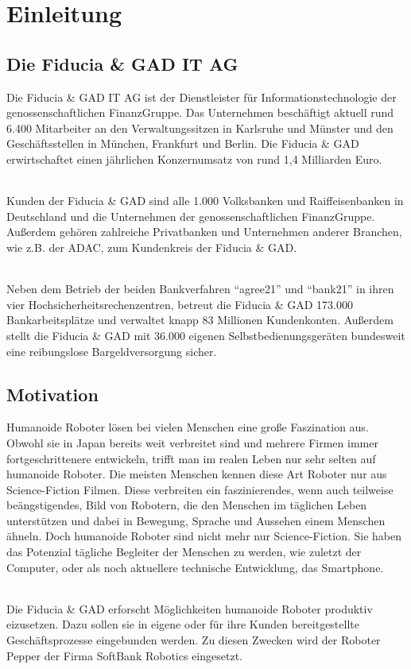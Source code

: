 \chapter{Einleitung}\label{sec:einleitung}
\section{Die Fiducia \& GAD IT AG}\label{sec:fiducia-gad}
Die Fiducia \& GAD IT AG ist der Dienstleister für Informationstechnologie der
genossenschaftlichen FinanzGruppe. Das Unternehmen beschäftigt aktuell rund
6.400 Mitarbeiter an den Verwaltungssitzen in Karlsruhe und Münster und den
Geschäftsstellen in München, Frankfurt und Berlin. Die Fiducia \& GAD
erwirtschaftet einen jährlichen Konzernumsatz von rund 1,4 Milliarden Euro.

\subparagraph{}
Kunden der Fiducia \& GAD sind alle 1.000 Volksbanken und Raiffeisenbanken in
Deutschland und die Unternehmen der genossenschaftlichen FinanzGruppe. Außerdem
gehören zahlreiche Privatbanken und Unternehmen anderer Branchen, wie z.B. der
ADAC, zum Kundenkreis der Fiducia \& GAD.

\subparagraph{}
Neben dem Betrieb der beiden Bankverfahren "`agree21"' und "`bank21"' in ihren
vier Hochsicherheitsrechenzentren, betreut die Fiducia \& GAD 173.000
Bankarbeitsplätze und verwaltet knapp 83 Millionen Kundenkonten. Außerdem stellt
die Fiducia \& GAD mit 36.000 eigenen Selbstbedienungsgeräten bundesweit eine
reibungslose Bargeldversorgung sicher. \cite{FiduciaGAD2018}

\section{Motivation}\label{sec:motivation}
Humanoide Roboter lösen bei vielen Menschen eine große Faszination aus. Obwohl
sie in Japan bereits weit verbreitet sind und mehrere Firmen immer
fortgeschrittenere entwickeln, trifft man im realen Leben nur sehr selten auf
humanoide Roboter. Die meisten Menschen kennen diese Art Roboter nur aus
Science-Fiction Filmen. Diese verbreiten ein faszinierendes, wenn auch teilweise
beängstigendes, Bild von Robotern, die den Menschen im täglichen Leben
unterstützen und dabei in Bewegung, Sprache und Aussehen einem Menschen ähneln.
Doch humanoide Roboter sind nicht mehr nur Science-Fiction. Sie haben das
Potenzial tägliche Begleiter der Menschen zu werden, wie zuletzt der Computer,
oder als noch aktuellere technische Entwicklung, das Smartphone.

\subparagraph{}
Die Fiducia \& GAD erforscht Möglichkeiten humanoide Roboter produktiv
eizusetzen. Dazu sollen sie in eigene oder für ihre Kunden bereitgestellte
Geschäftsprozesse eingebunden werden. Zu diesen Zwecken wird der Roboter Pepper
der Firma SoftBank Robotics eingesetzt.

